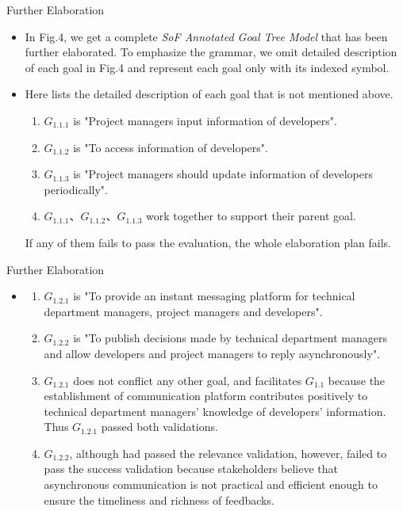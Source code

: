 ﻿\documentclass{beamer}
\begin{document}
\begin{frame}  {Further Elaboration}   %
  \footnotesize{
    \begin{itemize}
    \item
      In Fig.4, we get a complete \emph{SoF Annotated Goal Tree Model} that has been further elaborated. To emphasize the grammar,  we omit detailed description of each goal in Fig.4 and represent each goal only with its indexed symbol.\pause
    \item
      Here lists the detailed description of each goal that is not mentioned above.
      \begin{enumerate}
      \item $G_{1.1.1}$ is "Project managers input information of developers". 
      \item $G_{1.1.2}$ is "To access information of developers". 
      \item $G_{1.1.3}$ is "Project managers should update information of developers periodically". 
      \item $G_{1.1.1}$、$G_{1.1.2}$、$G_{1.1.3}$ work together to support their parent goal.
      \end{enumerate}
      If any of them fails to pass the evaluation, the whole elaboration plan fails.\pause
    \end{itemize}
  }
\end{frame}
\begin{frame} {Further Elaboration}
  \footnotesize{
    \begin{itemize}
    \item
      \begin{enumerate}
      \item $G_{1.2.1}$ is "To provide an instant messaging platform for technical department managers, project managers and developers".
      \item  $G_{1.2.2}$ is "To publish decisions made by technical department managers and allow developers and project managers to reply asynchronously".
      \item $G_{1.2.1}$ does not conflict any other goal, and facilitates $G_{1.1}$ because the establishment of communication platform contributes positively to technical department managers' knowledge of developers' information. Thus $G_{1.2.1}$ passed both validations.
      \item $G_{1.2.2}$, although had passed the relevance validation, however, failed to pass the success validation because stakeholders believe that asynchronous communication is not practical and efficient enough to ensure the timeliness and richness of feedbacks.      
      \end{enumerate}
    \end{itemize}
  }
\end{frame}
\end{document}
